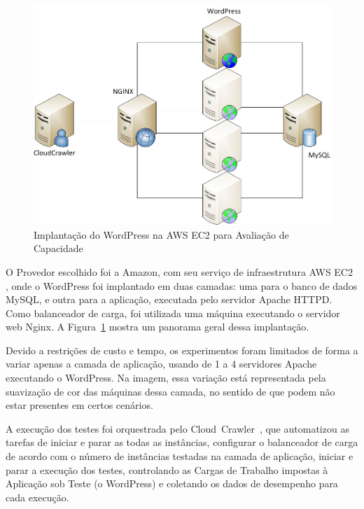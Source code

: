\begin{figure}[hbt]
  \caption{\label{fig:implantacao}Implantação do WordPress na AWS EC2 para Avaliação de Capacidade}
  \begin{center}
    \includegraphics[scale=0.4]{img/ImplantacaoWordPress}
  \end{center}
\end{figure}

O Provedor escolhido foi a Amazon, com seu serviço de infraestrutura AWS EC2
\cite{ec2}, onde o WordPress foi implantado em duas camadas: uma para o banco de 
dados MySQL, e outra para a aplicação, executada pelo servidor Apache HTTPD. Como
balanceador de carga, foi utilizada uma máquina executando o servidor web Nginx. A
Figura~\ref{fig:implantacao} mostra um panorama geral dessa implantação. 

Devido a restrições de custo e tempo, os experimentos foram limitados de forma a variar 
apenas a camada de aplicação, usando de 1 a 4 servidores Apache executando o WordPress. 
Na imagem, essa variação está representada pela suavização de cor das máquinas dessa 
camada, no sentido de que podem não estar presentes em certos cenários.

A execução dos testes foi orquestrada pelo Cloud~Crawler~\cite{cunha2012ambiente},
que automatizou as tarefas de iniciar e parar as todas as instâncias, configurar 
o balanceador de carga de acordo com o número de instâncias testadas na camada de 
aplicação, iniciar e parar a execução dos testes, controlando as Cargas de Trabalho
impostas à Aplicação sob Teste (o WordPress) e coletando os dados de desempenho 
para cada execução. 

